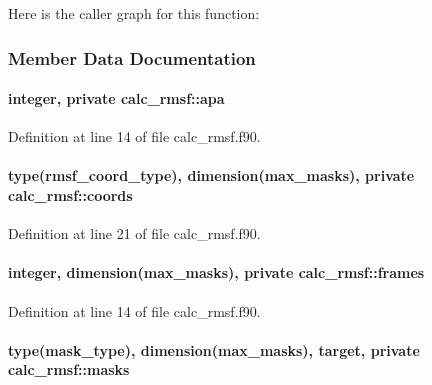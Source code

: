 Here is the caller graph for this function\-:




\subsubsection{Member Data Documentation}
\hypertarget{classcalc__rmsf_a671509930bbb2ef33a13ae3b201c7e35}{
\paragraph[{apa}]{\setlength{\rightskip}{0pt plus 5cm}integer, private calc\-\_\-rmsf\-::apa\hspace{0.3cm}{\ttfamily [private]}}}\label{classcalc__rmsf_a671509930bbb2ef33a13ae3b201c7e35}


Definition at line 14 of file calc\-\_\-rmsf.\-f90.

\hypertarget{classcalc__rmsf_aaa4f1782e837bd354df6292a661ad818}{
\paragraph[{coords}]{\setlength{\rightskip}{0pt plus 5cm}type({\bf rmsf\-\_\-coord\-\_\-type}), dimension({\bf max\-\_\-masks}), private calc\-\_\-rmsf\-::coords\hspace{0.3cm}{\ttfamily [private]}}}\label{classcalc__rmsf_aaa4f1782e837bd354df6292a661ad818}


Definition at line 21 of file calc\-\_\-rmsf.\-f90.

\hypertarget{classcalc__rmsf_a42572ad9b931268716909f2391c9082a}{
\paragraph[{frames}]{\setlength{\rightskip}{0pt plus 5cm}integer, dimension({\bf max\-\_\-masks}), private calc\-\_\-rmsf\-::frames\hspace{0.3cm}{\ttfamily [private]}}}\label{classcalc__rmsf_a42572ad9b931268716909f2391c9082a}


Definition at line 14 of file calc\-\_\-rmsf.\-f90.

\hypertarget{classcalc__rmsf_a2f331487d889adef9e9370125e3cdcaa}{
\paragraph[{masks}]{\setlength{\rightskip}{0pt plus 5cm}type(mask\-\_\-type), dimension({\bf max\-\_\-masks}), target, private calc\-\_\-rmsf\-::masks\hspace{0.3cm}{\ttfamily [private]}}}\label{classcalc__rmsf_a2f331487d889adef9e9370125e3cdcaa}


